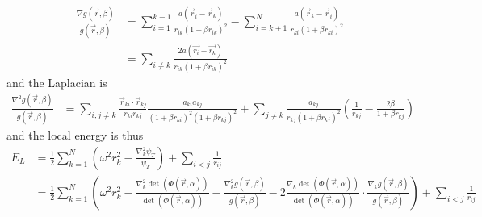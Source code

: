\documentclass[a4paper, hidelinks, 10pt]{article}\usepackage[utf8]{inputenc}
\newcommand{\suml}[2]{\sum\limits_{#1=1}^{#2}}
\begin{document}
        \begin{equation}
            \begin{aligned}
                \frac{\nabla g(\vec{r},\beta)}{g(\vec{r},\beta)} &=
                \suml{i}{k-1}
                \frac{a\left(\vec{r}_i-\vec{r}_k\right)}{r_{ik}\left(1+\beta
                r_{ik}\right)^2} - \sum\limits_{i=k+1}^N
                \frac{a\left(\vec{r}_k-\vec{r}_i\right)}{r_{ki}\left(1+\beta
                r_{ki}\right)^2} \\
                &= \sum\limits_{i\neq k} \frac{2a\left(\vec{r_i} -
                \vec{r_k}\right)}{r_{ik}\left(1+\beta r_{ik}\right)^2}
            \end{aligned}
            \label{eq:jastfirderrat}
        \end{equation}
    and the Laplacian is
        \begin{equation}
            \begin{aligned}
                \frac{\nabla^2 g(\vec{r},\beta)}{g(\vec{r},\beta)} &=
                \sum\limits_{i,j\neq k}
                \frac{\vec{r}_{ki}\cdot\vec{r}_{kj}}{r_{ki}r_{kj}}
                \frac{a_{ki}a_{kj}}{\left(1+\beta r_{ki}\right)^2 \left(1+\beta
                r_{kj}\right)^2} + \sum_{j\neq k}
                \frac{a_{kj}}{r_{kj}\left(1+\beta r_{kj}\right)^2}
                \left(\frac{1}{r_{kj}} - \frac{2\beta}{1+\beta r_{kj}}\right)
            \end{aligned}
            \label{eq:jastsecderrat}
        \end{equation}
    and the local energy is thus
        \begin{align}
            E_L &= \frac{1}{2}\suml{k}{N} \left(\omega^2r^2_k -
            \frac{\nabla^2_k\psi_T}{\psi_T}\right) + \sum_{i<j}
            \frac{1}{r_{ij}} \nonumber \\
            &= \frac{1}{2}\suml{k}{N} \left(\omega^2r^2_k -
            \frac{\nabla^2_k\det(\Phi(\vec{r},\alpha))}{\det(\Phi(\vec{r},\alpha))}
            - \frac{\nabla^2_kg(\vec{r},\beta)}{g(\vec{r},\beta)} -
            2\frac{\nabla_k\det(\Phi(\vec{r},\alpha))}{\det(\Phi(\vec{r},\alpha))}
            \cdot \frac{\nabla_kg(\vec{r},\beta)}{g(\vec{r},\beta)}\right) +
            \sum_{i<j} \frac{1}{r_{ij}}
            \label{eq:ELNfin}
        \end{align}
\end{document}
